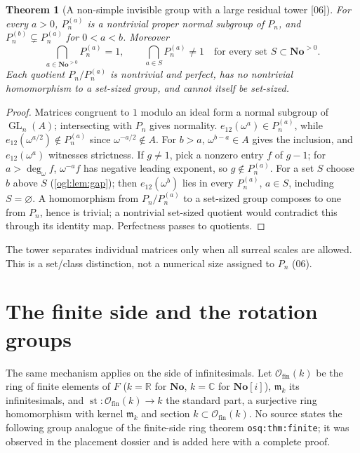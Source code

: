 \documentclass[11pt,oneside]{article}
\numberwithin{equation}{section}
\newtheorem{theorem}{Theorem}[section]
\theoremstyle{definition}
\theoremstyle{remark}
\newcommand{\No}{\mathbf{No}}
\newcommand{\SC}{\No[i]}
\newcommand{\R}{\mathbb R}
\newcommand{\C}{\mathbb C}
\newcommand{\Ofin}{\mathcal O_{\mathrm{fin}}}
\newcommand{\mm}{\mathfrak m}
\newcommand{\st}{\operatorname{st}}
\newcommand{\ddeg}{\operatorname{deg}_{\omega}}
\newcommand{\GL}{\operatorname{GL}}
\newcommand{\src}[1]{\textup{\textsf{\small[#1]}}}
\newcommand{\replabel}[1]{\nolinkurl{#1}}
\begin{document}
\begin{theorem}[A non-simple invisible group with a large residual tower \src{06}]\label{ogl:el:thm:tower}
For every $a>0$, $P_n^{(a)}$ is a nontrivial proper normal subgroup of $P_n$,
and $P_n^{(b)}\subsetneq P_n^{(a)}$ for $0<a<b$. Moreover
\[
 \bigcap_{a\in\No^{>0}}P_n^{(a)}=1,\qquad
 \bigcap_{a\in S}P_n^{(a)}\ne1\quad\text{for every set }S\subset\No^{>0}.
\]
Each quotient $P_n/P_n^{(a)}$ is nontrivial and perfect, has no nontrivial
homomorphism to a set-sized group, and cannot itself be set-sized.
\end{theorem}
\begin{proof}
Matrices congruent to $1$ modulo an ideal form a normal subgroup of $\GL_n(A)$;
intersecting with $P_n$ gives normality. $e_{12}(\omega^a)\in P_n^{(a)}$, while
$e_{12}(\omega^{a/2})\notin P_n^{(a)}$ since $\omega^{-a/2}\notin A$. For $b>a$,
$\omega^{b-a}\in A$ gives the inclusion, and $e_{12}(\omega^a)$ witnesses
strictness. If $g\ne1$, pick a nonzero entry $f$ of $g-1$; for $a>\ddeg f$,
$\omega^{-a}f$ has negative leading exponent, so $g\notin P_n^{(a)}$. For a set
$S$ choose $b$ above $S$ (\cref{ogl:lem:gap}); then $e_{12}(\omega^b)$ lies in
every $P_n^{(a)}$, $a\in S$, including $S=\varnothing$. A homomorphism from
$P_n/P_n^{(a)}$ to a set-sized group composes to one from $P_n$, hence is
trivial; a nontrivial set-sized quotient would contradict this through its
identity map. Perfectness passes to quotients.
\end{proof}

The tower separates individual matrices only when all surreal scales are
allowed. This is a set/class distinction, not a numerical size assigned to
$P_n$ (06).

\section{The finite side and the rotation groups}\label{ogl:el:sec:finiteside}

The same mechanism applies on the side of infinitesimals. Let $\Ofin(k)$ be
the ring of finite elements of $F$ ($k=\R$ for $\No$, $k=\C$ for $\SC$),
$\mm_k$ its infinitesimals, and $\st:\Ofin(k)\to k$ the standard part, a
surjective ring homomorphism with kernel $\mm_k$ and section $k\subset\Ofin(k)$.
No source states the following group analogue of the finite-side ring theorem
\replabel{osq:thm:finite}; it was observed in the placement dossier and is
added here with a complete proof.
\end{document}
